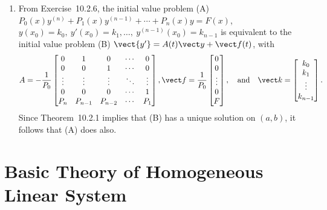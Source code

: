 \documentclass[openany]{book}
\newenvironment{sectionSolutions}{
 \begin{enumerate}[item-label={\thesection.\arabic{enumi}.}]
}{
 \end{enumerate}
}
\begin{document}
\begin{sectionSolutions}

\item
From Exercise~10.2.6, the initial value problem
(A) $P_0(x)y^{(n)}+P_1(x)y^{(n-1)}+\cdots+P_n(x)y=F(x)$,
$y(x_0)=k_0,\ y'(x_0)=k_1,\dots,\ y^{(n-1)}(x_0)=k_{n-1}$ is
equivalent to the initial value problem (B) ${\vect{ y'}}=A(t){\vect y}+{\vect
f}(t)$, with
\[A=-\frac{1}{ P_0}
\begin{bmatrix}
0&1&0&\cdots&0\\
0&0&1&\cdots&0\\
\vdots&\vdots&\vdots&\ddots&\vdots\\
0&0&0&\cdots&1\\
P_n&P_{n-1}&P_{n-2}&\cdots&P_1
\end{bmatrix},
{\vect f}=\frac{1}{ P_0}
\begin{bmatrix}
0\\ 0\\\vdots\\0\\F
\end{bmatrix},
\quad\text{and}\quad
{\vect k}=
\begin{bmatrix}
k_0\\k_1\\\vdots\\k_{n-1}
\end{bmatrix}.
\]
Since Theorem~10.2.1 implies that (B) has a unique solution on
$(a,b)$, it follows that (A) does also.
\end{sectionSolutions}

\section{Basic Theory of Homogeneous Linear System}
\end{document}
